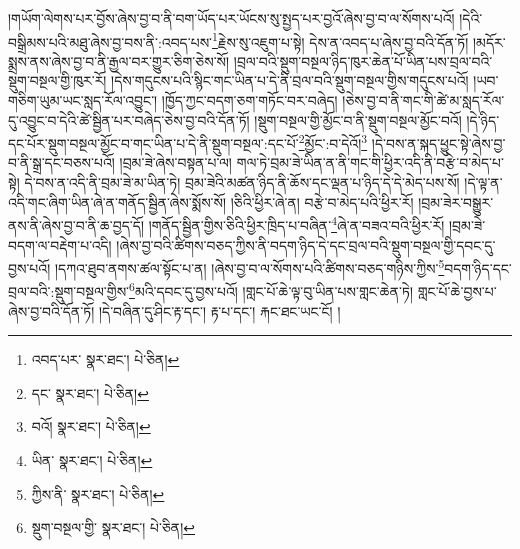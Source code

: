 །གཡོག་ལེགས་པར་བྱོས་ཞེས་བྱ་བ་ནི་བག་ཡོད་པར་ཡོངས་སུ་སྤྱད་པར་བྱའོ་ཞེས་བྱ་བ་ལ་སོགས་པའོ། །དེའི་བསྒྲིམས་པའི་མཐུ་ཞེས་བྱ་བས་ནི་:འབད་པས་\footnote{འབད་པར་  སྣར་ཐང་།  པེ་ཅིན། }རྗེས་སུ་འཇུག་པ་སྟེ། དེས་ན་འབད་པ་ཞེས་བྱ་བའི་དོན་ཏོ། །མདོར་སྨྲས་ནས་ཞེས་བྱ་བ་ནི་རྒྱལ་བར་གྱུར་ཅིག་ཅེས་སོ། །བྲལ་བའི་སྡུག་བསྔལ་ཉིད་ཁུར་ཆེན་པོ་ཡིན་པས་བྲལ་བའི་སྡུག་བསྔལ་གྱི་ཁུར་རོ། །དེས་གདུངས་པའི་སྙིང་གང་ཡིན་པ་དེ་ནི་བྲལ་བའི་སྡུག་བསྔལ་གྱིས་གདུངས་པའོ། །ཡབ་གཅིག་ཡུམ་ཡང་སླད་རོལ་འབྱུང་། །ཁྱོད་ཀྱང་བདག་ཅག་གཏོང་བར་བཞེད། །ཅེས་བྱ་བ་ནི་གང་གི་ཚེ་མ་སླད་རོལ་དུ་འབྱུང་བ་དེའི་ཚེ་སྦྱིན་པར་བཞེད་ཅེས་བྱ་བའི་དོན་ཏོ། །སྡུག་བསྔལ་གྱི་མྱོང་བ་ནི་སྡུག་བསྔལ་མྱོང་བའོ། །དེ་ཉིད་དང་པོར་སྡུག་བསྔལ་མྱོང་བ་གང་ཡིན་པ་དེ་ནི་སྡུག་བསྔལ་:དང་པོ་\footnote{དང་  སྣར་ཐང་།  པེ་ཅིན། }མྱོང་:བ་དེའོ།\footnote{བའོ།  སྣར་ཐང་།  པེ་ཅིན། } །དེ་བས་ན་སྐད་ཕྱུང་སྟེ་ཞེས་བྱ་བ་ནི་སྒྲ་དང་བཅས་པའོ། །བྲམ་ཟེ་ཞེས་བསྟན་པ་ལ། གལ་ཏེ་བྲམ་ཟེ་ཡིན་ན་ནི་གང་གི་ཕྱིར་འདི་ནི་བརྩེ་བ་མེད་པ་སྟེ། དེ་བས་ན་འདི་ནི་བྲམ་ཟེ་མ་ཡིན་ཏེ། བྲམ་ཟེའི་མཚན་ཉིད་ནི་ཆོས་དང་ལྡན་པ་ཉིད་དེ་དེ་མེད་པས་སོ། །དེ་ལྟ་ན་འདི་གང་ཞིག་ཡིན་ཞེ་ན་གནོད་སྦྱིན་ཞེས་སྨོས་སོ། །ཅིའི་ཕྱིར་ཞེ་ན། བརྩེ་བ་མེད་པའི་ཕྱིར་རོ། །བྲམ་ཟེར་བསྒྱུར་ནས་ནི་ཞེས་བྱ་བ་ནི་ཆ་བྱད་དོ། །གནོད་སྦྱིན་གྱིས་ཅིའི་ཕྱིར་ཁྲིད་པ་བཞིན་\footnote{ཡིན་  སྣར་ཐང་།  པེ་ཅིན། }ཞེ་ན་བཟའ་བའི་ཕྱིར་རོ། །བྲམ་ཟེ་བདག་ལ་བརྡེག་པ་འདི། །ཞེས་བྱ་བའི་ཚིགས་བཅད་ཀྱིས་ནི་བདག་ཉིད་དེ་དང་བྲལ་བའི་སྡུག་བསྔལ་གྱི་དབང་དུ་བྱས་པའོ། །དཀའ་ཐུབ་ནགས་ཚལ་སྟོང་པ་ན། །ཞེས་བྱ་བ་ལ་སོགས་པའི་ཚིགས་བཅད་གཉིས་ཀྱིས་\footnote{ཀྱིས་ནི་  སྣར་ཐང་།  པེ་ཅིན། }བདག་ཉིད་དང་བྲལ་བའི་:སྡུག་བསྔལ་གྱིས་\footnote{སྡུག་བསྔལ་གྱི་  སྣར་ཐང་།  པེ་ཅིན། }མའི་དབང་དུ་བྱས་པའོ། །གླང་པོ་ཆེ་ལྟ་བུ་ཡིན་པས་གླང་ཆེན་ཏེ། གླང་པོ་ཆེ་བྱས་པ་ཞེས་བྱ་བའི་དོན་ཏོ། །དེ་བཞིན་དུ་ཤིང་རྟ་དང་། རྟ་པ་དང་། རྐང་ཐང་ཡང་ངོ། །

